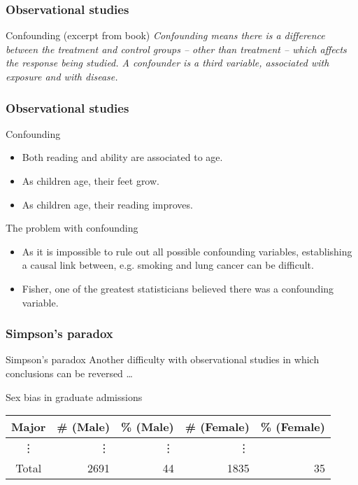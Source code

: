\documentclass[handout]{beamer}
\begin{document}
   \begin{frame} \frametitle{Observational studies}

   \begin{block}
     {Confounding (excerpt from book)}
   {\em Confounding means there is a difference between the treatment and control groups -- other than treatment -- which affects the response being studied. A confounder is a third variable, associated with exposure and with disease.}
   \end{block}
   \end{frame}


   \begin{frame} \frametitle{Observational studies}

   \begin{block}
     {Confounding}
     \begin{itemize}
     \item Both reading and ability are associated to age.
     \item As children age, their feet grow.
     \item As children age, their reading improves.
     \end{itemize}
    \end{block}

    \begin{block}
    {The problem with confounding}

    \begin{itemize}
    \item  As it is impossible to rule out all possible confounding variables, establishing a causal link between, e.g. smoking and lung cancer can be difficult.

     \item Fisher, one of the greatest statisticians believed there was a confounding variable.

    \end{itemize}

   \end{block}
   \end{frame}


   \begin{frame} \frametitle{Simpson's paradox}

   \begin{block}
   {Simpson's paradox}
   Another difficulty with observational studies in which
   conclusions can be reversed \dots
   \end{block}
   \begin{block}
   {Sex bias in graduate admissions}
   {\small
   \begin{tabular}{c|rr|rr}
   Major & \# (Male) & \% (Male) & \# (Female) & \% (Female) \\ \hline
   \vdots & \vdots & \vdots & \vdots \\ \hline
   Total & 2691 & 44 & 1835 & 35
   \end{tabular}
   }
   \end{block}
   \end{frame}
\end{document}
